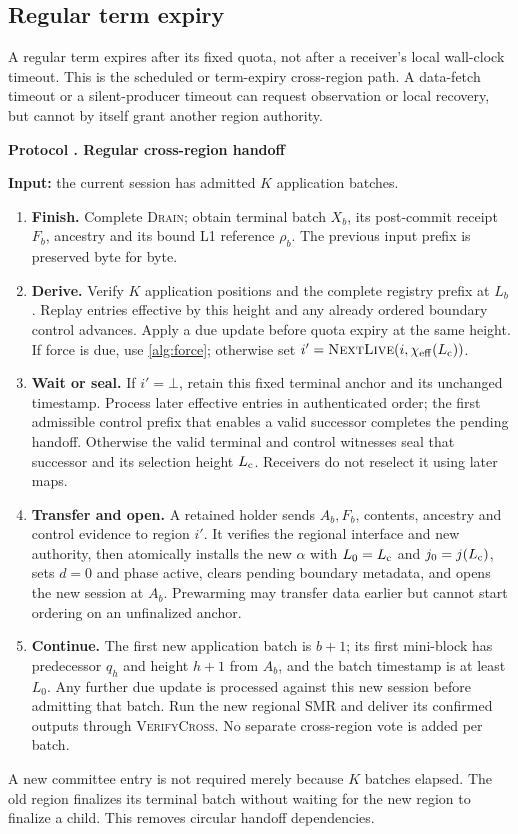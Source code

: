 \documentclass[11pt,a4paper,onecolumn]{article}
\newcommand{\Proc}[1]{\textnormal{\textsc{#1}}}
\newcounter{protocol}
\newenvironment{protocol}[2]{\refstepcounter{protocol}\label{#1}
\begin{mdframed}[nobreak=true,linewidth=.6pt,skipabove=9pt,skipbelow=9pt,
innertopmargin=7pt,innerbottommargin=7pt]\small
\noindent\textbf{Protocol \theprotocol. #2}\par\smallskip}{\end{mdframed}}
\begin{document}
\subsection{Regular term expiry}\label{sec:regular}
A regular term expires after its fixed quota, not after a receiver's local
wall-clock timeout. This is the scheduled or term-expiry cross-region path.
A data-fetch timeout or a silent-producer timeout can request observation
or local recovery, but cannot by itself grant another region authority.

\begin{protocol}{alg:regular}{Regular cross-region handoff}
\textbf{Input:} the current session has admitted $K$ application batches.
\begin{enumerate}[label=\textbf{R\arabic*.}]
\item \textbf{Finish.} Complete \Proc{Drain}; obtain terminal batch $X_b$,
its post-commit receipt $F_b$, ancestry and its bound L1 reference $\rho_b$.
The previous input prefix is preserved byte for byte.
\item \textbf{Derive.} Verify $K$ application positions and the complete
registry prefix at $L_b$. Replay entries effective by this height and any
already ordered boundary control advances. Apply a due update before quota
expiry at the same height. If force is due, use \cref{alg:force};
otherwise set $i'=\Proc{NextLive}(i,\chi_{\rm eff}(L_{\rm c}))$.
\item \textbf{Wait or seal.} If $i'=\bot$, retain this fixed terminal
anchor and its unchanged timestamp. Process later effective entries in
authenticated order; the first admissible control
prefix that enables a valid successor completes the pending handoff.
Otherwise the valid terminal and control witnesses seal that successor
and its selection height $L_{\rm c}$.
Receivers do not reselect it using later maps.
\item \textbf{Transfer and open.} A retained holder sends $A_b,F_b$,
contents, ancestry and control evidence to region $i'$. It verifies the
regional interface and new authority, then atomically installs the new
$\alpha$ with $L_0=L_{\rm c}$ and $j_0=j(L_{\rm c})$, sets $d=0$ and phase active, clears pending boundary metadata,
and opens the new session at $A_b$.
Prewarming may transfer data earlier but cannot start ordering on an
unfinalized anchor.
\item \textbf{Continue.} The first new application batch is $b+1$;
its first mini-block has predecessor $q_h$ and height $h+1$ from $A_b$,
and the batch timestamp is at least $L_0$. Any further due update is
processed against this new session before admitting that batch.
Run the new regional SMR and deliver its confirmed outputs through
\Proc{VerifyCross}. No separate cross-region vote is added per batch.
\end{enumerate}
\end{protocol}
A new committee entry is not required merely because $K$ batches elapsed.
The old region finalizes its terminal batch without waiting for the new
region to finalize a child. This removes circular handoff dependencies.
\end{document}
